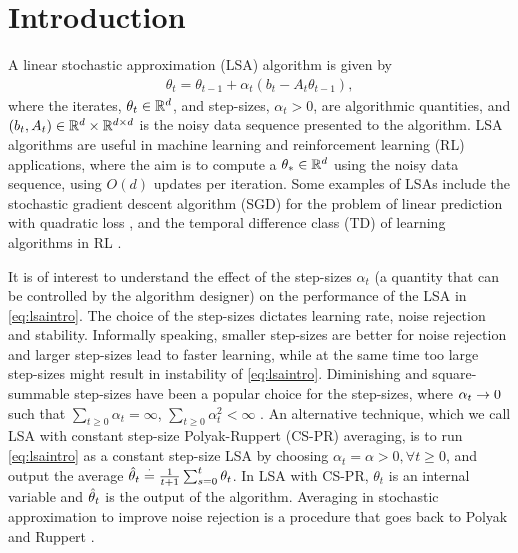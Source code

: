 \section{Introduction}
A linear stochastic approximation (LSA) algorithm is given by
\begin{align}\label{eq:lsaintro}
\theta_t=\theta_{t-1}+\alpha_t (b_t-A_t \theta_{t-1}),
\end{align}
where the iterates, $\theta_t\in \mathbb{R}^d$, and step-sizes, $\alpha_t>0$, are algorithmic quantities, and $(b_t,A_t)\in \mathbb{R}^d\times \mathbb{R}^{d \times d}$ is the noisy data sequence presented to the algorithm.
LSA algorithms are useful in machine learning and reinforcement learning (RL) applications, where the aim is to compute a $\theta_*\in \mathbb{R}^d$ using the noisy data sequence, using $O(d)$ updates per iteration. Some examples of LSAs include the stochastic gradient descent algorithm (SGD) for the problem of linear prediction with quadratic loss \cite{bach,bachaistats}, and the temporal difference class (TD) of learning algorithms in RL \cite{sutton,konda-tsitsiklis,gtd,gtd2,gtdmp}.\par
It is of interest to understand the effect of the step-sizes $\alpha_t$ (a quantity that can be controlled by the algorithm designer) on the performance of the LSA in \eqref{eq:lsaintro}. The choice of the step-sizes dictates learning rate, noise rejection and stability. Informally speaking, smaller step-sizes are better for noise rejection and larger step-sizes lead to faster learning, while at the same time too large step-sizes might result in instability of \eqref{eq:lsaintro}. Diminishing and square-summable step-sizes have been a popular choice for the step-sizes, where $\alpha_t\rightarrow 0$ such that $\sum_{t\geq 0} \alpha_t=\infty$, $\sum_{t\geq 0}\alpha^2_t<\infty$ \cite{gtd2,borkarbook,konda-tsitsiklis}. An alternative technique, which we call LSA with constant step-size Polyak-Ruppert (CS-PR) averaging, is to run \eqref{eq:lsaintro} as a constant step-size LSA by choosing $\alpha_t=\alpha>0,\forall t\geq 0$, and output the average $\hat{\theta}_t\stackrel{\cdot}{=}\frac{1}{t+1}\sum_{s=0}^t \theta_t$. In LSA with CS-PR, $\theta_t$ is an internal variable and $\hat{\theta}_t$ is the output of the algorithm.
Averaging in stochastic approximation to improve noise rejection is a procedure that goes back to  Polyak and Ruppert \cite{polyak-judisky,ruppert}.
